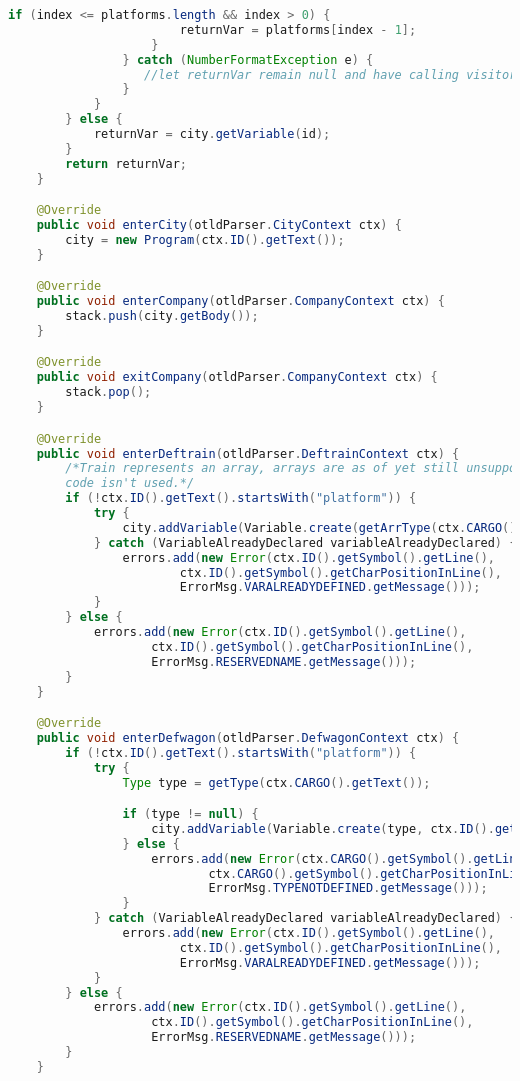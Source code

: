 \begin{landscape}
\begin{lstlisting}[language=Java]
                    if (index <= platforms.length && index > 0) {
                        returnVar = platforms[index - 1];
                    }
                } catch (NumberFormatException e) {
                   //let returnVar remain null and have calling visitor throw an error
                }
            }
        } else {
            returnVar = city.getVariable(id);
        }
        return returnVar;
    }

    @Override
    public void enterCity(otldParser.CityContext ctx) {
        city = new Program(ctx.ID().getText());
    }

    @Override
    public void enterCompany(otldParser.CompanyContext ctx) {
        stack.push(city.getBody());
    }

    @Override
    public void exitCompany(otldParser.CompanyContext ctx) {
        stack.pop();
    }

    @Override
    public void enterDeftrain(otldParser.DeftrainContext ctx) {
        /*Train represents an array, arrays are as of yet still unsupported in our intermediate representation so this
        code isn't used.*/
        if (!ctx.ID().getText().startsWith("platform")) {
            try {
                city.addVariable(Variable.create(getArrType(ctx.CARGO().getText()), ctx.ID().getText(), null));
            } catch (VariableAlreadyDeclared variableAlreadyDeclared) {
                errors.add(new Error(ctx.ID().getSymbol().getLine(),
                        ctx.ID().getSymbol().getCharPositionInLine(),
                        ErrorMsg.VARALREADYDEFINED.getMessage()));
            }
        } else {
            errors.add(new Error(ctx.ID().getSymbol().getLine(),
                    ctx.ID().getSymbol().getCharPositionInLine(),
                    ErrorMsg.RESERVEDNAME.getMessage()));
        }
    }

    @Override
    public void enterDefwagon(otldParser.DefwagonContext ctx) {
        if (!ctx.ID().getText().startsWith("platform")) {
            try {
                Type type = getType(ctx.CARGO().getText());

                if (type != null) {
                    city.addVariable(Variable.create(type, ctx.ID().getText(), null));
                } else {
                    errors.add(new Error(ctx.CARGO().getSymbol().getLine(),
                            ctx.CARGO().getSymbol().getCharPositionInLine(),
                            ErrorMsg.TYPENOTDEFINED.getMessage()));
                }
            } catch (VariableAlreadyDeclared variableAlreadyDeclared) {
                errors.add(new Error(ctx.ID().getSymbol().getLine(),
                        ctx.ID().getSymbol().getCharPositionInLine(),
                        ErrorMsg.VARALREADYDEFINED.getMessage()));
            }
        } else {
            errors.add(new Error(ctx.ID().getSymbol().getLine(),
                    ctx.ID().getSymbol().getCharPositionInLine(),
                    ErrorMsg.RESERVEDNAME.getMessage()));
        }
    }


\end{lstlisting}
\end{landscape}
